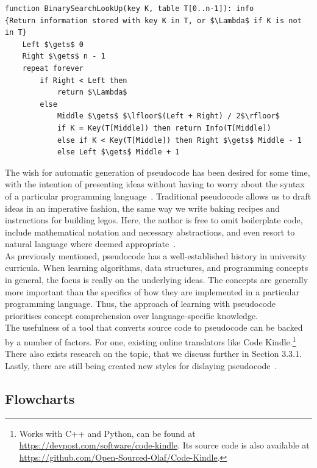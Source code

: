 \begin{lstlisting}[basicstyle=\footnotesize\ttfamily, caption={Binary Search by Lewis et al.}, captionpos=b, label={Binary Search by Lewis et al.}]
function BinarySearchLookUp(key K, table T[0..n-1]): info
{Return information stored with key K in T, or $\Lambda$ if K is not in T}
    Left $\gets$ 0
    Right $\gets$ n - 1
    repeat forever
        if Right < Left then
            return $\Lambda$
        else
            Middle $\gets$ $\lfloor$(Left + Right) / 2$\rfloor$
            if K = Key(T[Middle]) then return Info(T[Middle])
            else if K < Key(T[Middle]) then Right $\gets$ Middle - 1
            else Left $\gets$ Middle + 1
\end{lstlisting}

The wish for automatic generation of pseudocode has been desired for some time, with the intention of presenting ideas without having to worry about the syntax of a particular programming language~\cite{desireToGetPseudocodeGeneration}. Traditional pseudocode allows us to draft ideas in an imperative fashion, the same way we write baking recipes and instructions for building legos. Here, the author is free to omit boilerplate code, include mathematical notation and necessary abstractions, and even resort to natural language where deemed appropriate~\cite{pseudocodeInBook1, freedomOfPseudocode}. \\

As previously mentioned, pseudocode has a well-established history in university curricula. When learning algorithms, data structures, and programming concepts in general, the focus is really on the underlying ideas. The concepts are generally more important than the specifics of how they are implemented in a particular programming language. Thus, the approach of learning with pseudocode prioritises concept comprehension over language-specific knowledge. \\

The usefulness of a tool that converts source code to pseudocode can be backed by a number of factors. For one, existing online translators like Code Kindle.\footnote{Works with C++ and Python, can be found at \url{https://devpost.com/software/code-kindle}. Its source code is also available at \url{https://github.com/Open-Sourced-Olaf/Code-Kindle}.} There also exists research on the topic, that we discuss further in Section 3.3.1. Lastly, there are still being created new styles for dislaying pseudocode~\cite{displayingPseudocode}.

\subsection{Flowcharts}

